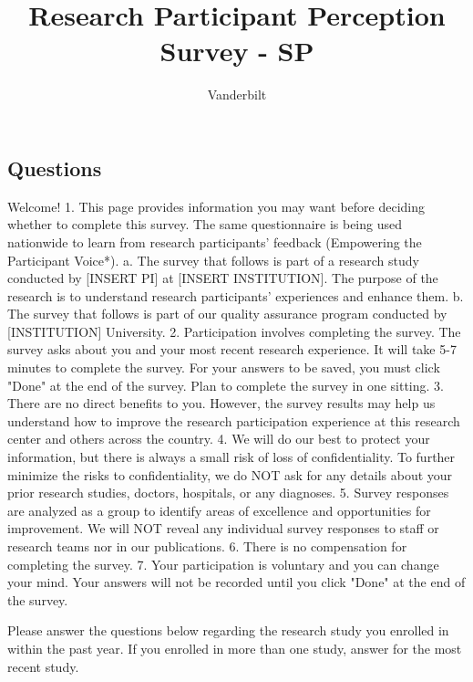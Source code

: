 \documentclass[english,pagemark,stamp,oneside,print_questionnaire_id]{sdapsclassic}
\author{Vanderbilt}
\title{Research Participant Perception Survey - SP}
\begin{document}
                \begin{questionnaire}
                \begin{Form}
                    
                \section{Questions}
                    \begin{info}
                        Welcome!   1. This page provides information you may want before deciding whether to complete this survey.  The same questionnaire is being used nationwide to learn from research participants' feedback (Empowering the Participant Voice*).    a. The survey that follows is part of a research study conducted by [INSERT PI] at [INSERT INSTITUTION].  The purpose of the research is to understand research participants' experiences and enhance them.       b. The survey that follows is part of our quality assurance program conducted by [INSTITUTION] University.  2. Participation involves completing the survey.  The survey asks about you and your most recent research experience.  It will take 5-7 minutes to complete the survey. For your answers to be saved, you must click "Done" at the end of the survey. Plan to complete the survey in one sitting.  3. There are no direct benefits to you. However, the survey results may help us understand how to improve the research participation experience at this research center and others across the country.   4. We will do our best to protect your information, but there is always a small risk of loss of confidentiality.  To further minimize the risks to confidentiality, we do NOT ask for any details about your prior research studies, doctors, hospitals, or any diagnoses.  5. Survey responses are analyzed as a group to identify areas of excellence and opportunities for improvement. We will NOT reveal any individual survey responses to staff or research teams nor in our publications.   6. There is no compensation for completing the survey.  7. Your participation is voluntary and you can change your mind. Your answers will not be recorded until you click "Done" at the end of the survey.
                    \end{info}
                        \begin{info}
                            Please answer the questions below regarding the research study you enrolled in within the past year. If you enrolled in more than one study, answer for the most recent study.


\end{info}
\end{Form}
\end{questionnaire}
\end{document}
